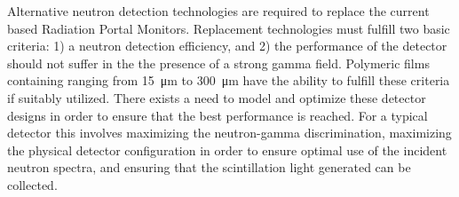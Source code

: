 Alternative neutron detection technologies are required to replace the current  based Radiation Portal Monitors.
Replacement technologies must fulfill two basic criteria: 1) a neutron detection efficiency, and 2) the performance of the detector should not suffer in the the presence of a strong gamma field.
Polymeric films containing  ranging from \SI{15}{\um} to \SI{300}{\um} have the ability to fulfill these criteria if suitably utilized.
There exists a need to model and optimize these detector designs in order to ensure that the best performance is reached. 
For a typical detector this involves maximizing the neutron-gamma discrimination, maximizing the physical detector configuration in order to ensure optimal use of the incident neutron spectra, and ensuring that the scintillation light generated can be collected.


